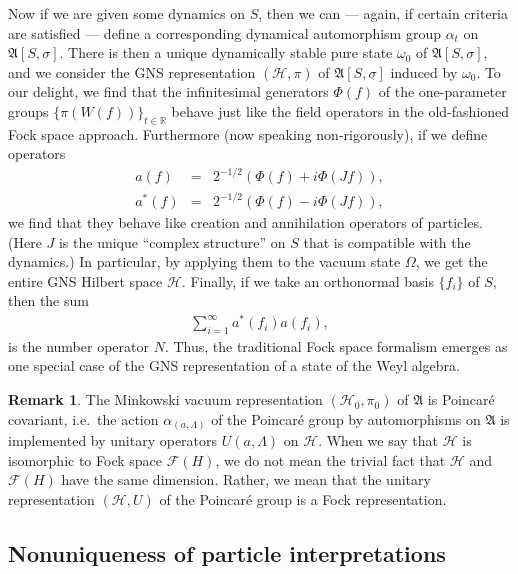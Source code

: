 \documentclass[11pt]{article}
\newcommand{\alg}[1]{\mathfrak{#1}}
\theoremstyle{definition}
\theoremstyle{definition}
\newtheorem{note}[thm]{Remark}
\theoremstyle{remark}
\def\2#1{{\mathcal #1}}
\def\7#1{{\mathbb #1}}
\def\al#1{{\mathfrak #1}}
\def\a{\alpha} \def\b{\beta} \def\g{\gamma} \def\d{\delta}
\def\om{\omega} \def\Om{\Omega} \def\dd{\partial} \def\D{\Delta}
\begin{document}
Now if we are given some dynamics on $S$, then we can --- again, if
certain criteria are satisfied --- define a corresponding dynamical
automorphism group $\a _t$ on $\alg{A}[S,\sigma ]$.  There is then a
unique dynamically stable pure state $\om _0$ of $\alg{A}[S,\sigma ]$,
and we consider the GNS representation $(\2H ,\pi )$ of
$\alg{A}[S,\sigma ]$ induced by $\om _0$.  To our delight, we find
that the infinitesimal generators $\Phi (f)$ of the one-parameter
groups $\{ \pi (W(f)) \}_{t\in \7R}$ behave just like the field
operators in the old-fashioned Fock space approach.  Furthermore (now
speaking non-rigorously), if we define operators
\begin{eqnarray*} 
  a(f) &=& 2^{-1/2}\left( \Phi (f)+i\Phi (Jf) \right) , \\
  a^*(f) &=& 2^{-1/2}\left( \Phi (f)-i\Phi (Jf) \right) ,
\end{eqnarray*} 
we find that they behave like creation and annihilation operators of
particles.  (Here $J$ is the unique ``complex structure'' on $S$ that
is compatible with the dynamics.)  In particular, by applying them to
the vacuum state $\Om$, we get the entire GNS Hilbert space $\2H$.
Finally, if we take an orthonormal basis $\{ f_i\}$ of $S$, then the
sum
\begin{eqnarray*} \sum _{i=1}^{\infty} a ^*(f_i)a(f_ i) ,\end{eqnarray*}
is the number operator $N$.  Thus, the traditional Fock space
formalism emerges as one special case of the GNS representation of a
state of the Weyl algebra.

\begin{note} The Minkowski vacuum representation $(\2H _0,\pi _0 )$ of
  $\al A$ is Poincar{\'e} covariant, i.e.\ the action $\a _{(a,\Lambda
    )}$ of the Poincar{\'e} group by automorphisms on $\al A$ is
  implemented by unitary operators $U(a,\Lambda )$ on $\2H$.  When we
  say that $\2H$ is isomorphic to Fock space $\2F (H)$, we do not mean
  the trivial fact that $\2H$ and $\2F (H)$ have the same dimension.
  Rather, we mean that the unitary representation $(\2H ,U)$ of the
  Poincar{\'e} group is a Fock representation.  \end{note}


\subsection{Nonuniqueness of particle interpretations}
\end{document}
